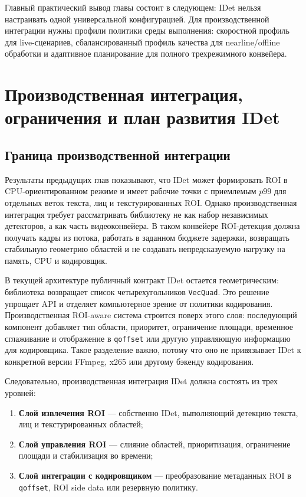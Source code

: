 \documentclass[12pt,a4paper,oneside,openany]{report}
\newcommand{\important}[1]{\textbf{#1}}
\begin{document}
Главный практический вывод главы состоит в следующем: IDet нельзя настраивать одной
универсальной конфигурацией. Для производственной интеграции нужны профили политики среды
выполнения: скоростной профиль для live-сценариев, сбалансированный профиль качества для
nearline/offline обработки и адаптивное планирование для полного трехрежимного конвейера.


\chapter{Производственная интеграция, ограничения и план развития IDet}


\section{Граница производственной интеграции}

Результаты предыдущих глав показывают, что IDet может формировать ROI в CPU-ориентированном
режиме и имеет рабочие точки с приемлемым $p99$ для отдельных веток текста, лиц и
текстурированных ROI. Однако производственная интеграция требует рассматривать библиотеку не как
набор независимых детекторов, а как часть видеоконвейера. В таком конвейере ROI-детекция должна
получать кадры из потока, работать в заданном бюджете задержки, возвращать стабильную геометрию
областей и не создавать непредсказуемую нагрузку на память, CPU и кодировщик.

В текущей архитектуре публичный контракт IDet остается геометрическим: библиотека возвращает
список четырехугольников \texttt{VecQuad}. Это решение упрощает API и отделяет компьютерное
зрение от политики кодирования. Производственная ROI-aware система строится поверх этого слоя:
последующий компонент добавляет тип области, приоритет, ограничение площади, временное
сглаживание и отображение в \texttt{qoffset} или другую управляющую информацию для кодировщика.
Такое разделение важно, потому что оно не привязывает IDet к конкретной версии FFmpeg, x265 или
другому бэкенду кодирования.

Следовательно, производственная интеграция IDet должна состоять из трех уровней:
\begin{enumerate}[label=\arabic*)]
  \item \important{Слой извлечения ROI} --- собственно IDet, выполняющий детекцию текста, лиц и
      текстурированных областей;
  \item \important{Слой управления ROI} --- слияние областей, приоритизация, ограничение площади и
      стабилизация во времени;
  \item \important{Слой интеграции с кодировщиком} --- преобразование метаданных ROI в
      \texttt{qoffset}, ROI side data или резервную политику.
\end{enumerate}
\end{document}
